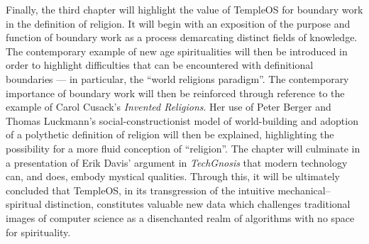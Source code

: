 \documentclass[Draft.tex]{subfiles}
\begin{document}
Finally, the third chapter will highlight the value of TempleOS for
boundary work in the definition of religion.
It will begin with an exposition of the purpose and function of boundary
work as a process demarcating distinct fields of knowledge.
The contemporary example of new age spiritualities will then be
introduced in order to highlight difficulties that can be encountered
with definitional boundaries --- in particular, the ``world religions
paradigm''.
The contemporary importance of boundary work will then be reinforced
through reference to the example of Carol Cusack's \textit{Invented Religions}.
Her use of Peter Berger and Thomas Luckmann's social-constructionist model of
world-building and adoption of a polythetic definition of religion will then
be explained, highlighting the possibility for a more fluid conception of
``religion''.
The chapter will culminate in a presentation of Erik Davis' argument in
\textit{TechGnosis} that modern technology can, and does, embody mystical
qualities.
Through this, it will be ultimately concluded that TempleOS, in its transgression
of the intuitive mechanical--spiritual distinction, constitutes valuable
new data which challenges traditional images of
computer science as a disenchanted realm of algorithms with no space for
spirituality.
\end{document}
